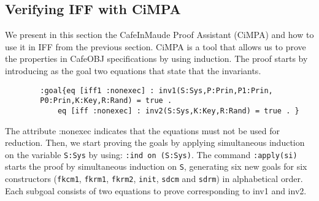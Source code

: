 \documentclass[a4paper,fleqn]{cas-dc}
\begin{document}
\subsection{Verifying IFF with CiMPA} \label{cimpa}
We present in this section the CafeInMaude Proof Assistant (CiMPA) and how to use it in IFF from the previous section. CiMPA is a tool that allows us to prove the properties in CafeOBJ specifications by using induction. The proof starts by introducing as the goal two equations that state that the invariants.
	\begin{verbatim}
		:goal{eq [iff1 :nonexec] : inv1(S:Sys,P:Prin,P1:Prin,
		P0:Prin,K:Key,R:Rand) = true .
			eq [iff :nonexec] : inv2(S:Sys,K:Key,R:Rand) = true . }
	\end{verbatim}
	\noindent
The attribute :nonexec indicates that the equations must not be used for reduction.
Then, we start proving the goals by applying simultaneous
induction on the variable \verb!S:Sys! by using: \verb!:ind on (S:Sys)!.
The command \verb!:apply(si)! starts the proof by simultaneous induction on \verb!S!, generating six new goals for six constructors (\verb!fkcm1!, \verb!fkrm1!, \verb!fkrm2!, \verb!init!, \verb!sdcm! and \verb!sdrm!) in alphabetical order. Each subgoal consists of two equations to prove corresponding to inv1 and inv2. 
\end{document}
